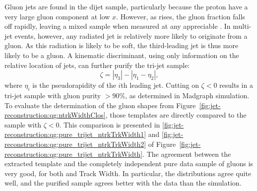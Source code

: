 Gluon jets are found in the dijet sample, particularly because the proton have a very large gluon component at low $x$. However, as \pt rises, the gluon fraction falls off rapidly, leaving a mixed sample when measured at any appreciable \pt. In multi-jet events, however, any radiated jet is relatively more likely to originate from a gluon. As this radiation is likely to be soft, the third-leading jet is thus more likely to be a gluon. A kinematic discriminant, using only information on the relative location of jets, can further purify the tri-jet sample: 
%
\begin{equation}
\zeta=|\eta_3|-|\eta_1-\eta_2|,
\end{equation}
%
where $\eta_i$ is the pseudorapidity of the $i$th leading jet. Cutting on $\zeta < 0$ results in a tri-jet sample with gluon purity $> 90\%$, as determined in {\sc Madgraph} simulation. To evaluate the determination of the gluon shapes from Figure~\ref{fig:jet-reconstruction:qg:ntrkWidthClos}, those templates are directly compared to the sample with $\zeta < 0$. This comparison is presented in \ref{fig:jet-reconstruction:qg:pure_trijet_ntrkTrkWidth1} and \ref{fig:jet-reconstruction:qg:pure_trijet_ntrkTrkWidth2} of Figure~\ref{fig:jet-reconstruction:qg:pure_trijet_ntrkTrkWidth}. The agreement between the extracted template and the completely independent pure data sample of gluons is very good, for both \ntrk and Track Width. In particular, the \ntrk distributions agree quite well, and the purified sample agrees better with the data than the \Pythia simulation.

